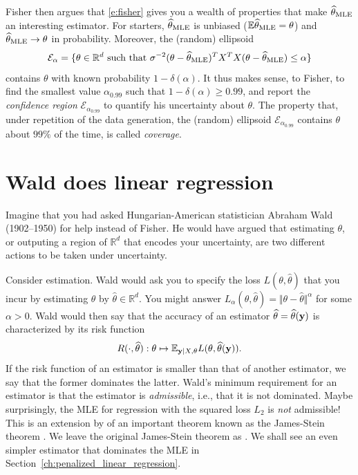 Fisher then argues that \eqref{e:fisher} gives you a wealth of properties that make $\widehat{\theta}_{\text{MLE}}$ an interesting estimator.
For starters, $\widehat{\theta}_{\text{MLE}}$ is unbiased ($\mathbb E \widehat{\theta}_{\text{MLE}} = \theta$)
and $\widehat{\theta}_{\text{MLE}} \rightarrow \theta$ in probability. 
Moreover, the (random) ellipsoid 
$$
\mathcal{E}_\alpha = \{\theta\in\mathbb{R}^d \text{ such that }\sigma^{-2}(\theta-\widehat{\theta}_{\text{MLE}})^TX^T X(\theta-\widehat{\theta}_{\text{MLE}}) \leq \alpha\} 
$$
contains $\theta$ with known probability $1-\delta(\alpha)$.
It thus makes sense, to Fisher, to find the smallest value $\alpha_{0.99}$ such that $1-\delta(\alpha)\geq 0.99$, and report the \emph{confidence region} $\mathcal{E}_{\alpha_0.99}$ to quantify his uncertainty about $\theta$. 
The property that, under repetition of the data generation, the (random) ellipsoid $\mathcal{E}_{\alpha_{0.99}}$ contains $\theta$ about $99\%$ of the time, is called \emph{coverage}.

\section{Wald does linear regression}
Imagine that you had asked Hungarian-American statistician Abraham Wald (1902--1950) for help instead of Fisher.
He would have argued that estimating $\theta$, or outputing a region of $\mathbb{R}^d$ that encodes your uncertainty, are two different actions to be taken under uncertainty. 

Consider estimation. 
Wald would ask you to specify the loss $L(\theta,\widehat{\theta})$ that you incur by estimating $\theta$ by $\widehat{\theta}\in\mathbb{R}^d$. 
You might answer $L_\alpha(\theta,\widehat{\theta}) = \Vert\theta-\widehat{\theta}\Vert^\alpha$ for some $\alpha>0$.
Wald would then say that the accuracy of an estimator $\widehat{\theta}= \widehat{\theta}(\mathbf{y})$ is characterized by its risk function
\begin{equation}
    R(\cdot,\widehat{\theta}):\theta\mapsto \mathbb{E}_{\mathbf{y}\vert X, \theta} L(\theta,\widehat{\theta}(\mathbf{y})).
    \label{e:risk}
\end{equation}
If the risk function of an estimator is smaller than that of another estimator, we say that the former dominates the latter.
Wald's minimum requirement for an estimator is that the estimator is \emph{admissible}, i.e., that it is not dominated. 
Maybe surprisingly, the MLE for regression with the squared loss $L_2$ is \emph{not} admissible! 
This is an extension by \cite{TBC} of an important theorem known as the James-Stein theorem \citep{TBC}.
We leave the original James-Stein theorem as . 
We shall see an even simpler estimator that dominates the MLE in Section~\ref{ch:penalized_linear_regression}.

